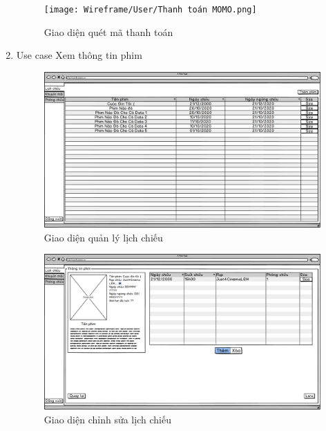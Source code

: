 \documentclass[a4paper, 12pt]{article}
\begin{document}
\begin{enumerate}
        \begin{figure}[H]
            \begin{center}
                \texttt{[image: Wireframe/User/Thanh toán MOMO.png]}
                \caption{Giao diện quét mã thanh toán}
            \end{center}
        \end{figure}

        \item Use case Xem thông tin phim
        \begin{figure}[H]
            \begin{center}
                \includegraphics[scale = 0.25]{Wireframe/Manager/Quản lý_Dashboard_Lịch chiếu.png}
                \caption{Giao diện quản lý lịch chiếu}
            \end{center}
        \end{figure}

        \begin{figure}[H]
            \begin{center}
                \includegraphics[scale = 0.25]{Wireframe/Manager/Quản lý_Dashboard_Sửa phim.png}
                \caption{Giao diện chỉnh sửa lịch chiếu}
            \end{center}
        \end{figure}


\end{enumerate}
\end{document}
